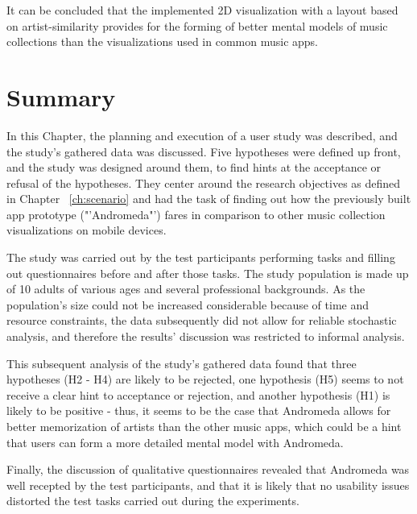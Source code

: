 It can be concluded that the implemented 2D visualization with a layout based on artist-similarity provides for the forming of better mental models of music collections than the visualizations used in common music apps.

\section{Summary}

In this Chapter, the planning and execution of a user study was described, and the study's gathered data was discussed. Five hypotheses were defined up front, and the study was designed around them, to find hints at the acceptance or refusal of the hypotheses. They center around the research objectives as defined in Chapter ~\ref{ch:scenario} and had the task of finding out how the previously built app prototype ("'Andromeda"') fares in comparison to other music collection visualizations on mobile devices. 

The study was carried out by the test participants performing tasks and filling out questionnaires before and after those tasks. The study population is made up of 10 adults of various ages and several professional backgrounds. As the population's size could not be increased considerable because of time and resource constraints, the data subsequently did not allow for reliable stochastic analysis, and therefore the results' discussion was restricted to informal analysis.

This subsequent analysis of the study's gathered data found that three hypotheses (H2 - H4) are likely to be rejected, one hypothesis (H5) seems to not receive a clear hint to acceptance or rejection, and another hypothesis (H1) is likely to be positive - thus, it seems to be the case that Andromeda allows for better memorization of artists than the other music apps, which could be a hint that users can form a more detailed mental model with Andromeda.

Finally, the discussion of qualitative questionnaires revealed that Andromeda was well recepted by the test participants, and that it is likely that no usability issues distorted the test tasks carried out during the experiments.